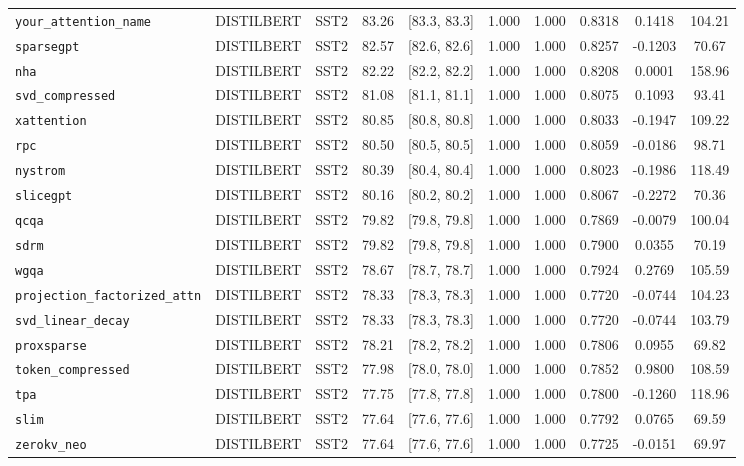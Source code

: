 \begin{table}[t]
\begin{tabular}{l l l c c c c c c c}
\texttt{your\_attention\_name} & DISTILBERT & SST2 & 83.26 & [83.3, 83.3] & 1.000 & 1.000 & 0.8318 & 0.1418 & 104.21 \\
\texttt{sparsegpt} & DISTILBERT & SST2 & 82.57 & [82.6, 82.6] & 1.000 & 1.000 & 0.8257 & -0.1203 & 70.67 \\
\texttt{nha} & DISTILBERT & SST2 & 82.22 & [82.2, 82.2] & 1.000 & 1.000 & 0.8208 & 0.0001 & 158.96 \\
\texttt{svd\_compressed} & DISTILBERT & SST2 & 81.08 & [81.1, 81.1] & 1.000 & 1.000 & 0.8075 & 0.1093 & 93.41 \\
\texttt{xattention} & DISTILBERT & SST2 & 80.85 & [80.8, 80.8] & 1.000 & 1.000 & 0.8033 & -0.1947 & 109.22 \\
\texttt{rpc} & DISTILBERT & SST2 & 80.50 & [80.5, 80.5] & 1.000 & 1.000 & 0.8059 & -0.0186 & 98.71 \\
\texttt{nystrom} & DISTILBERT & SST2 & 80.39 & [80.4, 80.4] & 1.000 & 1.000 & 0.8023 & -0.1986 & 118.49 \\
\texttt{slicegpt} & DISTILBERT & SST2 & 80.16 & [80.2, 80.2] & 1.000 & 1.000 & 0.8067 & -0.2272 & 70.36 \\
\texttt{qcqa} & DISTILBERT & SST2 & 79.82 & [79.8, 79.8] & 1.000 & 1.000 & 0.7869 & -0.0079 & 100.04 \\
\texttt{sdrm} & DISTILBERT & SST2 & 79.82 & [79.8, 79.8] & 1.000 & 1.000 & 0.7900 & 0.0355 & 70.19 \\
\texttt{wgqa} & DISTILBERT & SST2 & 78.67 & [78.7, 78.7] & 1.000 & 1.000 & 0.7924 & 0.2769 & 105.59 \\
\texttt{projection\_factorized\_attn} & DISTILBERT & SST2 & 78.33 & [78.3, 78.3] & 1.000 & 1.000 & 0.7720 & -0.0744 & 104.23 \\
\texttt{svd\_linear\_decay} & DISTILBERT & SST2 & 78.33 & [78.3, 78.3] & 1.000 & 1.000 & 0.7720 & -0.0744 & 103.79 \\
\texttt{proxsparse} & DISTILBERT & SST2 & 78.21 & [78.2, 78.2] & 1.000 & 1.000 & 0.7806 & 0.0955 & 69.82 \\
\texttt{token\_compressed} & DISTILBERT & SST2 & 77.98 & [78.0, 78.0] & 1.000 & 1.000 & 0.7852 & 0.9800 & 108.59 \\
\texttt{tpa} & DISTILBERT & SST2 & 77.75 & [77.8, 77.8] & 1.000 & 1.000 & 0.7800 & -0.1260 & 118.96 \\
\texttt{slim} & DISTILBERT & SST2 & 77.64 & [77.6, 77.6] & 1.000 & 1.000 & 0.7792 & 0.0765 & 69.59 \\
\texttt{zerokv\_neo} & DISTILBERT & SST2 & 77.64 & [77.6, 77.6] & 1.000 & 1.000 & 0.7725 & -0.0151 & 69.97 \\

\end{tabular}
\end{table}

